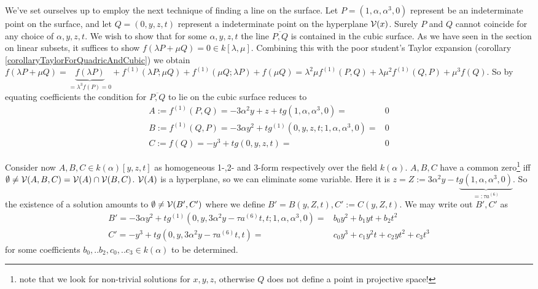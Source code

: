We've set ourselves up to employ the next technique of finding a line on the surface.
Let $P= (1,\alpha,\alpha^3,0)$ represent be an indeterminate point on the surface,
and let $Q = (0,y,z,t)$ represent a indeterminate point on the hyperplane $\operatorname{\mathcal V}(x)$.
Surely $P$ and $Q$ cannot coincide for any choice of $\alpha,y,z,t$.
We wish to show that for some $\alpha,y,z,t$ the line $\overline{P,Q}$ is contained in the cubic surface.
As we have seen in the section on linear subsets, it suffices to show $f(\lambda P + \mu Q) = 0 \in k[\lambda,\mu]$.
Combining this with the poor student's Taylor expansion (corollary \ref{corollaryTaylorForQuadricAndCubic}) we obtain
$f(\lambda P + \mu Q)
= \underset{=\lambda^3 f(P) = 0}{\underbrace{f(\lambda P)}}
+ f^{(1)}(\lambda P;\mu Q)
+ f^{(1)}(\mu Q;\lambda P)
+ f(\mu Q)
= \lambda^2\mu f^{(1)}(P,Q)
+ \lambda\mu^2 f^{(1)}(Q,P)
+ \mu^3 f(Q)$.
So by equating coefficients the condition for $\overline{P,Q}$ to lie on the cubic surface reduces to
\begin{align}
A :=  f^{(1)}(P,Q) = -3\alpha^2 y + z + tg(1,\alpha,\alpha^3,0) =& 0 \\
B :=  f^{(1)}(Q,P) = -3\alpha y^2 + tg^{(1)}(0,y,z,t;1,\alpha,\alpha^3,0) =& 0 \\
C :=  f(Q)         = -y^3 + tg(0,y,z,t) =& 0
\end{align}

Consider now $A,B,C \in k(\alpha)[y,z,t]$ as homogeneous 1-,2- and 3-form respectively over the field $k(\alpha)$.
$A,B,C$ have a common zero\footnote{note that we look for non-trivial solutions for $x,y,z$, otherwise $Q$ does not define a point in projective space!} iff $\emptyset \neq \operatorname{\mathcal V}(A,B,C) = \operatorname{\mathcal V}(A) \cap \operatorname{\mathcal V}(B,C)$.
$\operatorname{\mathcal V}(A)$ is a hyperplane, so we can eliminate some variable. Here it is $z = Z := 3\alpha^2 y - t\underset{=: \tau a^{(6)}}{\underbrace{g(1,\alpha,\alpha^3,0)}}$.
So the existence of a solution amounts to $\emptyset \neq \operatorname{\mathcal V}(B',C')$ where we define $B' = B(y,Z,t), C' := C(y,Z,t)$.
We may write out $B',C'$ as
\begin{align}
B' = -3\alpha y^2 + tg^{(1)}(0,y,3\alpha^2y - \tau a^{(6)}t,t;1,\alpha,\alpha^3,0) =& b_0y^2 + b_1yt + b_2 t^2 \\
C' = -y^3 + tg(0,y,3\alpha^2y-\tau a^{(6)}t,t) =& c_0y^3 + c_1y^2t + c_2 yt^2 + c_3t^3
\end{align}
for some coefficients $b_0,..b_2,c_0,..c_3 \in k(\alpha)$ to be determined.

